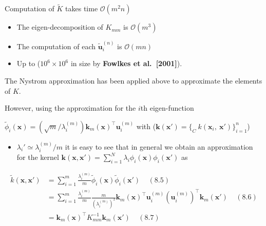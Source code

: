 \documentclass[
  ignorenonframetext,
]{beamer}
\providecommand{\tightlist}{%
  \setlength{\itemsep}{0pt}\setlength{\parskip}{0pt}}
\begin{document}
\begin{frame}{}
\protect\hypertarget{section}{}
\begin{block}{Computation of \({ \tilde K}\) takes time
\(\mathcal O(m^2n)\)}
\protect\hypertarget{computation-of-tilde-k-takes-time-mathcal-om2n}{}
\begin{itemize}
\tightlist
\item
  The eigen-decomposition of \(K_{mm}\) is \(\mathcal O(m^3)\)
\item
  The computation of each \(\pmb {\tilde u}^{(n)}_i\) is
  \(\mathcal O(mn)\)
\item
  Up to (\(10^6 \times 10^6\) in size by \textbf{Fowlkes et
  al.~{[}2001{]}}).
\end{itemize}
\end{block}
\end{frame}

\begin{frame}{}
\protect\hypertarget{section-1}{}
The Nystrom approximation has been applied above to approximate the
elements of \(K\).

However, using the approximation for the \(i\)th eigen-function

\(\tilde \phi_i(\pmb x) = (\sqrt m / {\lambda}_i^{(m)}) \pmb k_m(\pmb x)^{\top} \pmb u_i^{(m)}\)
with (\(\pmb k(\pmb x') = \{_C\ k(\pmb x_i,\ \pmb x') \}_{i=1}^n\))

\begin{itemize}
\tightlist
\item
  \({\lambda}_i' \simeq {\lambda}_i^{(m)}/m\) it is easy to see that in
  general we obtain an approximation for the kernel
  \(\pmb k(\pmb x, \pmb x') = \sum^N_{i=1} {\lambda}_i \phi_i(\pmb x) \phi_i(\pmb x')\)
  as
\end{itemize}

\[
\begin{split}
{\tilde k}(\pmb x, \pmb x') & = \sum^m_{i=1} \frac {{\lambda}^{(m)}_i} m \tilde \phi_i(\pmb x) \tilde \phi_i(\pmb x')  \ \ \ \ \ (8.5) \\
& = \sum^m_{i=1} \frac {{\lambda}^{(m)}_i} m 
\frac m {( {\lambda}_i^{(m)})^2} \pmb k_m(\pmb x) ^{\top} \pmb u_i^{(m)} (\pmb u_i^{(m)})^{\top} \pmb k_m(\pmb x') \ \ \ \ \ (8.6)\\
& = \pmb k_m(\pmb x)^{\top} K_{mm}^{-1} \pmb k_m(\pmb x') \ \ \ \ \ (8.7)
\end{split}
\]
\end{frame}
\end{document}

